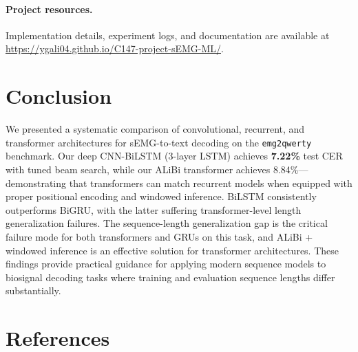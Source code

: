 \documentclass{article}
\begin{document}
\paragraph{Project resources.}
Implementation details, experiment logs, and documentation are available at \url{https://ygali04.github.io/C147-project-sEMG-ML/}.


\section{Conclusion}

We presented a systematic comparison of convolutional, recurrent, and transformer architectures for sEMG-to-text decoding on the \texttt{emg2qwerty} benchmark. Our deep CNN-BiLSTM (3-layer LSTM) achieves \textbf{7.22\%} test CER with tuned beam search, while our ALiBi transformer achieves 8.84\%---demonstrating that transformers can match recurrent models when equipped with proper positional encoding and windowed inference. BiLSTM consistently outperforms BiGRU, with the latter suffering transformer-level length generalization failures. The sequence-length generalization gap is the critical failure mode for both transformers and GRUs on this task, and ALiBi + windowed inference is an effective solution for transformer architectures. These findings provide practical guidance for applying modern sequence models to biosignal decoding tasks where training and evaluation sequence lengths differ substantially.


\section*{References}
\medskip
\end{document}
